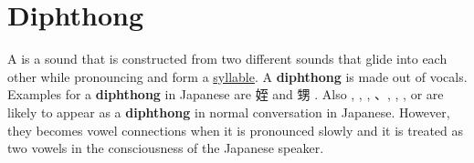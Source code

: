 \section{Diphthong} \label{sec:Diphthong}

A  is a sound that is
constructed from two different sounds that glide into each other while
pronouncing and form a \hyperref[sec:Syllable]{syllable}. A \textbf{diphthong}
is made out of vocals.  Examples for a \textbf{diphthong} in Japanese are {姪}
 and {甥} .  Also  ,
, ,
、, ,
,  or  are
likely to appear as a \textbf{diphthong} in normal conversation in Japanese.
However, they becomes vowel connections when it is pronounced slowly and it is
treated as two vowels in the consciousness of the Japanese speaker.

